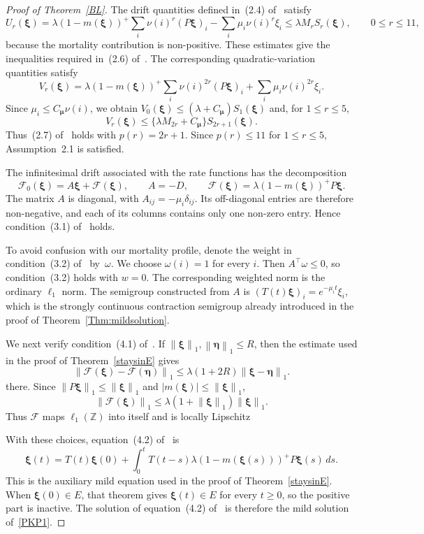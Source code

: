 \documentclass[12pt]{article}
\newcommand\F{\ensuremath{\mathcal{F}}}
\newcommand{\bxi}{\boldsymbol{\xi}}
\newcommand{\bmu}{\boldsymbol{\mu}}
\newcommand{\norm}[1]{\left\lVert #1 \right\rVert}
\begin{document}
\begin{proof}[Proof of Theorem~\ref{BL}]
The drift quantities defined in~(2.4) of~\cite{BL12b} satisfy
$$
 U_r(\bxi)
 =
 \lambda(1-m(\bxi))^+
 \sum_i\nu(i)^r(P\bxi)_i
 -
 \sum_i\mu_i\nu(i)^r\xi_i
 \leq
 \lambda M_rS_r(\bxi),
 \qquad 0\leq r\leq11,
$$
because the mortality contribution is non-positive. These estimates
give the inequalities required in~(2.6) of~\cite{BL12b}.
The corresponding quadratic-variation quantities satisfy
\[
 V_r(\bxi)
 =
 \lambda(1-m(\bxi))^+
 \sum_i\nu(i)^{2r}(P\bxi)_i
 +
 \sum_i\mu_i\nu(i)^{2r}\xi_i.
\]
Since $\mu_i\leq C_{\!\bmu}\nu(i)$, we obtain
$V_0(\bxi)\leq(\lambda+C_{\!\bmu})S_1(\bxi)$
and, for $1\leq r\leq5$,
\[
 V_r(\bxi)
 \leq
 \{\lambda M_{2r}+C_{\!\bmu}\}S_{2r+1}(\bxi).
\]
Thus~(2.7) of~\cite{BL12b} holds with $p(r)=2r+1$. Since
$p(r)\leq11$ for $1\leq r\leq5$, Assumption~2.1 is satisfied.

The infinitesimal drift associated with the rate functions has the
decomposition
\[
 \F_0(\bxi)=A\bxi+\F(\bxi),
 \qquad
 A=-D,
 \qquad
 \F(\bxi)=\lambda(1-m(\bxi))^+P\bxi.
\]
The matrix $A$ is diagonal, with $A_{ij}=-\mu_i\delta_{ij}$. Its
off-diagonal entries are therefore non-negative, and each of its
columns contains only one non-zero entry. Hence condition~(3.1)
of~\cite{BL12b} holds.

To avoid confusion with our mortality profile, denote the weight in
condition~(3.2) of~\cite{BL12b} by~$\omega$. We choose
$\omega(i)=1$ for every $i$. Then $A^\top\omega\leq0$, so
condition~(3.2) holds with $w=0$. The corresponding weighted norm is
the ordinary $\ell_1$ norm. The semigroup constructed from $A$ is
$(T(t)\bxi)_i=e^{-\mu_i t}\xi_i$,
which is the strongly continuous contraction semigroup already
introduced in the proof of Theorem~\ref{Thm:mildsolution}.

We next verify condition~(4.1) of~\cite{BL12b}. If
$\norm{\bxi}_1,\norm{\boldsymbol{\eta}}_1\leq R$, then the estimate used
in the proof of Theorem~\ref{staysinE} gives
\[
 \norm{\F(\bxi)-\F(\boldsymbol{\eta})}_1
 \leq
 \lambda(1+2R)\norm{\bxi-\boldsymbol{\eta}}_1.
\]
there.
Since $\norm{P\bxi}_1\leq\norm{\bxi}_1$ and $|m(\bxi)|\leq\norm{\bxi}_1$,
\[
 \norm{\mathcal F(\bxi)}_1
 \leq
 \lambda(1+\norm{\bxi}_1)\norm{\bxi}_1.
\]
Thus $\F$ maps $\ell_1(\mathbb Z)$ into itself and is locally Lipschitz

With these choices, equation~(4.2) of~\cite{BL12b} is
\[
 \bxi(t)
 =
 T(t)\bxi(0)
 +
 \int_0^t
 T(t-s)\lambda(1-m(\bxi(s)))^+P\bxi(s)\,ds.
\]
This is the auxiliary mild equation used in the proof of
Theorem~\ref{staysinE}. When $\bxi(0)\in E$, that theorem gives
$\bxi(t)\in E$ for every $t\geq0$, so the positive part is inactive.
The solution of equation~(4.2) of~\cite{BL12b} is therefore the mild
solution of~\eqref{PKP1}.


\end{proof}
\end{document}

